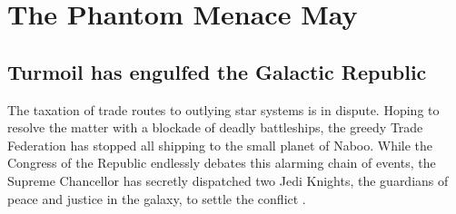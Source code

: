 \chapter{The Phantom Menace	May}
\section{Turmoil has engulfed the Galactic Republic}
The taxation of trade routes to outlying star systems is in 
dispute. Hoping to resolve the matter with a blockade of 
deadly battleships, the greedy Trade Federation has stopped 
all shipping to the small planet of Naboo. While the Congress 
of the Republic endlessly debates this alarming chain of 
events, the Supreme Chancellor has secretly dispatched two 
Jedi Knights, the guardians of peace and justice in the 
galaxy, to settle the conflict \cite{bib_binks99, bib_quigon99}.

\lipsum[1-10]
